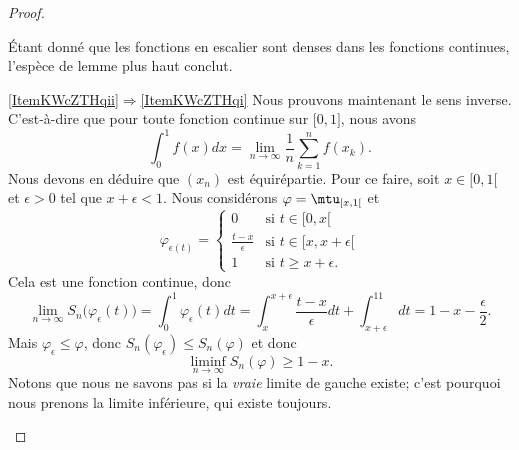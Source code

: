 \begin{proof}
\begin{subproof}
    Étant donné que les fonctions en escalier sont denses dans les fonctions continues, l'espèce de lemme plus haut conclut.

    \item[\ref{ItemKWcZTHqii}\( \Rightarrow\)\ref{ItemKWcZTHqi}]
    Nous prouvons maintenant le sens inverse. C'est-à-dire que pour toute fonction continue sur \( \mathopen[ 0 , 1 \mathclose]\), nous avons
    \begin{equation}
        \int_0^1f(x)dx=\lim_{n\to \infty} \frac{1}{ n }\sum_{k=1}^nf(x_k).
    \end{equation}
    Nous devons en déduire que \( (x_n)\) est équirépartie. Pour ce faire, soit \( x\in \mathopen[ 0 , 1 [\) et \( \epsilon>0\) tel que \( x+\epsilon<1\). Nous considérons \( \varphi=\mtu_{\mathopen[ x , 1 [}\) et
    \begin{equation}
        \varphi_{\epsilon(t)}=\begin{cases}
            0    &   \text{si } t\in\mathopen[ 0 , x [\\
            \frac{ t-x }{ \epsilon }    &   \text{si } t\in \mathopen[ x , x+\epsilon [\\
            1    &    \text{si } t\geq x+\epsilon.
        \end{cases}
    \end{equation}
    Cela est une fonction continue, donc
    \begin{equation}
        \lim_{n\to \infty} S_n\big( \varphi_{\epsilon}(t) \big)=\int_0^1\varphi_{\epsilon}(t)dt=\int_{x}^{x+\epsilon}\frac{ t-x }{ \epsilon }dt+\int_{x+\epsilon}^11dt=1-x-\frac{ \epsilon }{2}.
    \end{equation}
    Mais \( \varphi_{\epsilon}\leq \varphi\), donc \( S_n(\varphi_{\epsilon})\leq S_n(\varphi)\) et donc
    \begin{equation}
        \liminf_{n\to \infty}S_n(\varphi)\geq 1-x.
    \end{equation}
    Notons que nous ne savons pas si la \emph{vraie} limite de gauche existe; c'est pourquoi nous prenons la limite inférieure, qui existe toujours.


\end{subproof}
\end{proof}

